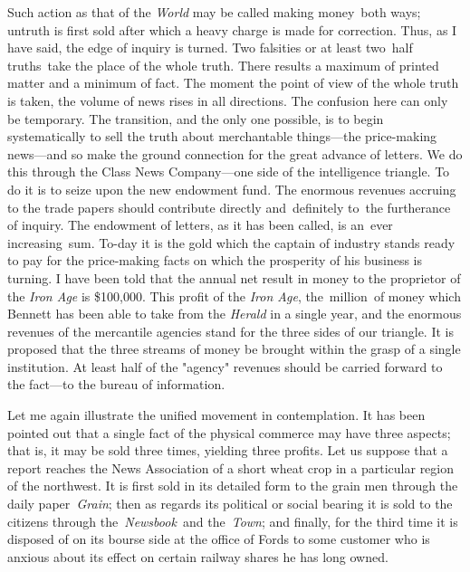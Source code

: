 \documentclass[openany,nobib]{tufte-book}
\begin{document}
Such action as that of the \emph{World} may be called making money~both
ways; untruth is first sold after which a heavy charge is made for
correction. Thus, as I have said, the edge of inquiry is turned. Two
falsities or at least two~half truths~take the place of the whole truth.
There results a maximum of printed matter and a minimum of fact. The
moment the point of view of the whole truth is taken, the volume of news
rises in all directions. The confusion here can only be temporary. The
transition, and the only one possible, is to begin systematically to
sell the truth about merchantable things---the price-making news---and
so make the ground connection for the great advance of letters. We do
this through the Class News Company---one side of the intelligence
triangle. To do it is to seize upon the new endowment fund. The enormous
revenues accruing to the trade papers should contribute directly
and~definitely to~the furtherance of inquiry. The endowment of letters,
as it has been called, is an~ever increasing~sum. To-day it is the gold
which the captain of industry stands ready to pay for the price-making
facts on which the prosperity of his business is turning. I have been
told that the annual net result in money to the proprietor of the
\emph{Iron Age} is \$100,000. This profit of the \emph{Iron Age},
the~million~of money which Bennett has been able to take from the
\emph{Herald} in a single year, and the enormous revenues of the
mercantile agencies stand for the three sides of our triangle. It is
proposed that the three streams of money be brought within the grasp of
a single institution. At least half of the "agency" revenues should be
carried forward to the fact---to the bureau of information.~

Let me again illustrate the unified movement in contemplation. It has
been pointed out that a single fact of the physical commerce may have
three aspects; that is, it may be sold three times, yielding three
profits. Let us suppose that a report reaches the News Association of a
short wheat crop in a particular region of the northwest. It is first
sold in its detailed form to the grain men through the daily
paper\emph{~Grain}; then as regards its political or social bearing it
is sold to the citizens through the~\emph{Newsbook~}and the~\emph{Town};
and finally, for the third time it is disposed of on its bourse side at
the office of Fords to some customer who is anxious about its effect on
certain railway shares he has long owned.~
\end{document}
